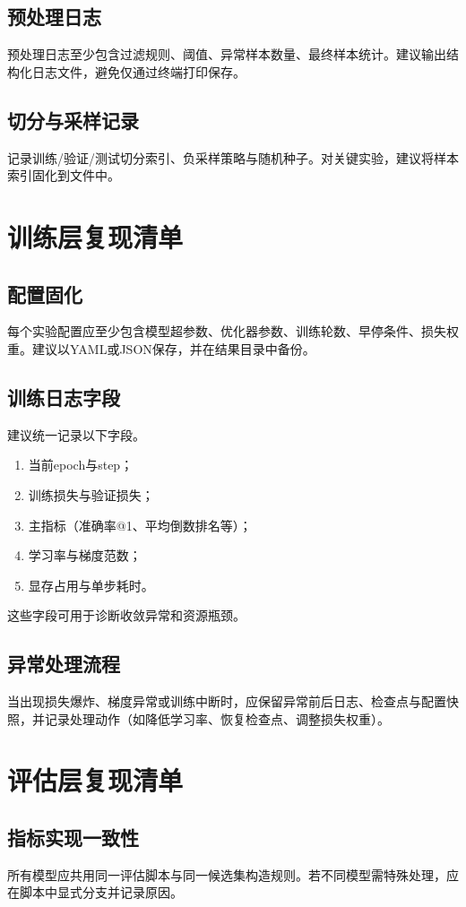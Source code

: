 \subsection{预处理日志}
预处理日志至少包含过滤规则、阈值、异常样本数量、最终样本统计。建议输出结构化日志文件，避免仅通过终端打印保存。

\subsection{切分与采样记录}
记录训练/验证/测试切分索引、负采样策略与随机种子。对关键实验，建议将样本索引固化到文件中。

\section{训练层复现清单}
\subsection{配置固化}
每个实验配置应至少包含模型超参数、优化器参数、训练轮数、早停条件、损失权重。建议以YAML或JSON保存，并在结果目录中备份。

\subsection{训练日志字段}
建议统一记录以下字段。
\begin{enumerate}
    \item 当前epoch与step；
    \item 训练损失与验证损失；
    \item 主指标（准确率@1、平均倒数排名等）；
    \item 学习率与梯度范数；
    \item 显存占用与单步耗时。
\end{enumerate}
\par\indent 这些字段可用于诊断收敛异常和资源瓶颈。

\subsection{异常处理流程}
当出现损失爆炸、梯度异常或训练中断时，应保留异常前后日志、检查点与配置快照，并记录处理动作（如降低学习率、恢复检查点、调整损失权重）。

\section{评估层复现清单}
\subsection{指标实现一致性}
所有模型应共用同一评估脚本与同一候选集构造规则。若不同模型需特殊处理，应在脚本中显式分支并记录原因。

